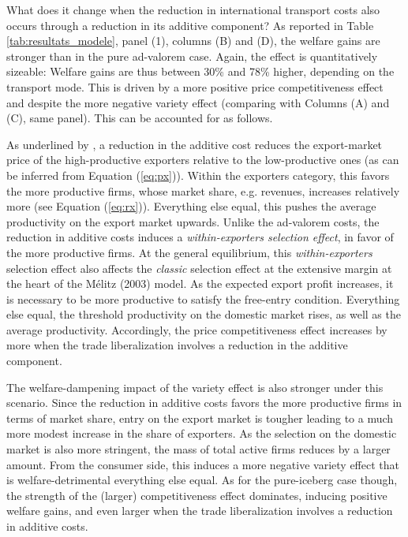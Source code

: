 \documentclass[a4paper,11pt]{article}
\begin{document}
What does it change when the reduction in international transport costs also occurs
through a reduction in its additive component? As reported in Table \ref{tab:resultats_modele}, panel (1), columns (B) and (D), the welfare gains are stronger than in the pure ad-valorem case. Again, the effect is quantitatively sizeable: Welfare gains are thus between 30\% and 78\% higher, depending on the transport mode. This is driven by a more positive price competitiveness effect and despite the more negative variety effect (comparing with Columns (A) and (C), same panel). This can be accounted for as follows.

As underlined by \cite{sorensen2014}, a reduction in the additive cost reduces the export-market price of the high-productive
exporters relative to the low-productive ones (as can be inferred from Equation (\ref{eq:px})).
Within the exporters category, this favors the more productive firms, whose market share,
e.g. revenues, increases relatively more (see Equation (\ref{eq:rx})). Everything else equal, this
pushes the average productivity on the export market upwards. Unlike the ad-valorem
costs, the reduction in additive costs induces a \textit{within-exporters selection effect}, in favor of
the more productive firms. At the general equilibrium, this \textit{within-exporters} selection effect
also affects the \textit{classic} selection effect at the extensive margin at the heart of the M\'{e}litz
(2003) model. As the expected export profit increases, it is necessary to be more productive
to satisfy the free-entry condition. Everything else equal, the threshold productivity
on the domestic market rises, as well as the average productivity. Accordingly, the
price competitiveness effect increases by more when the trade liberalization involves a reduction
in the additive component.

The welfare-dampening impact of the variety effect is also stronger under this scenario. Since the reduction in additive costs favors the more productive firms in terms of market share, entry on the export market is tougher leading to a much more modest increase in the
share of exporters. As the selection on the domestic market is also more stringent, the
mass of total active firms reduces by a larger amount. From the consumer side, this induces
a more negative variety effect that is welfare-detrimental everything else equal. As for the
pure-iceberg case though, the strength of the (larger) competitiveness effect dominates,
inducing positive welfare gains, and even larger when the trade liberalization involves a
reduction in additive costs.\medskip
\end{document}

